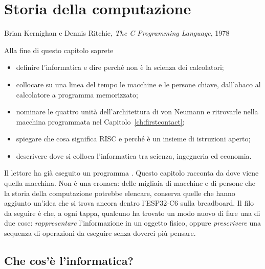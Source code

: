 \chapter{Storia della computazione}
\label{ch:history}

  {Brian Kernighan e Dennis Ritchie, \emph{The C Programming Language}, 1978}

\begin{chapgoals}
Alla fine di questo capitolo saprete
\begin{itemize}
\item definire l'informatica e dire perché non è la scienza dei calcolatori;
\item collocare su una linea del tempo le macchine e le persone chiave,
  dall'abaco al calcolatore a programma memorizzato;
\item nominare le quattro unità dell'architettura di von Neumann e ritrovarle
  nella macchina programmata nel Capitolo~\ref{ch:firstcontact};
\item spiegare che cosa significa RISC e perché \riscv è un insieme di
  istruzioni aperto;
\item descrivere dove si colloca l'informatica tra scienza, ingegneria ed economia.
\end{itemize}
\end{chapgoals}


Il lettore ha già eseguito un programma \riscv. Questo capitolo racconta da
dove viene quella macchina. Non è una cronaca: delle migliaia di macchine e di
persone che la storia della computazione potrebbe elencare, conserva quelle che
hanno aggiunto un'idea che si trova ancora dentro l'ESP32-C6 sulla breadboard.
Il filo da seguire è che, a ogni tappa, qualcuno ha trovato un modo nuovo di
fare una di due cose: \emph{rappresentare} l'informazione in un oggetto fisico,
oppure \emph{prescrivere} una sequenza di operazioni da eseguire senza doverci
più pensare.

\section{Che cos'è l'informatica?}

